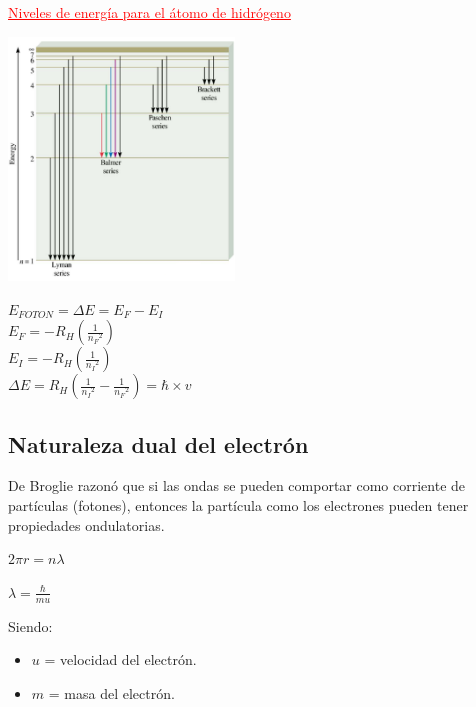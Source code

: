         \begin{center} \textcolor{red}{\underline{Niveles de energía para el átomo de hidrógeno}} \end{center}
            \begin{center} \includegraphics[width=6cm]{./imagenes/nivelesDeEnergia2.png} \end{center}

            \begin{center} 
                $E_{FOTON} = \Delta E = E_F - E_I$ \\[5pt]
                $E_F = - R_H (\frac{1}{{n_F}^{2}})$ \\[5pt]
                $E_I = -R_H (\frac{1}{{n_I}^{2}})$ \\[5pt]
                $\Delta E = R_H (\frac{1}{{n_I}^{2}} - \frac{1}{{n_F}^{2}}) = \hbar \times v$
            \end{center}
        
    \subsection{Naturaleza dual del electrón}
        \indent De Broglie razonó que si las ondas se pueden comportar como corriente de partículas (fotones), entonces la partícula como los electrones pueden tener propiedades ondulatorias. 
        \begin{center} $2 \pi r = n \lambda$ \end{center}
        \begin{center} $\lambda = \frac{\hbar}{mu}$ \end{center}        \indent Siendo:
        \begin{itemize} 
            \item $u$ = velocidad del electrón.
            \item $m$ = masa del electrón.
        \end{itemize}
    

